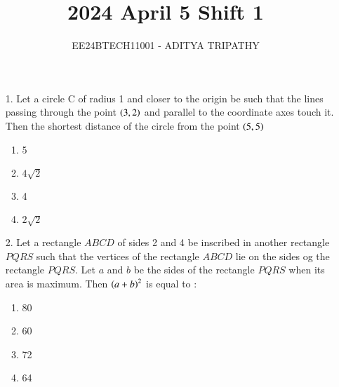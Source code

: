 \documentclass[journal,12pt,onecolumn]{IEEEtran}
\theoremstyle{remark}
\begin{document}

\vspace{3cm}

\title{2024 April 5 Shift 1}
\author{EE24BTECH11001 -  ADITYA TRIPATHY}
\maketitle

\renewcommand{\thefigure}{\theenumi}
\renewcommand{\thetable}{\theenumi}

\begin{enumerate}
	\item[1.] 
	    Let a circle C of radius 1 and closer to the origin be such that the lines
        passing through the point $\left(3, 2\right)$ and parallel to the coordinate axes touch it.
        Then the shortest distance of the circle from the point $\left(5, 5\right)$
		\hfill{}
	\begin{multicols}{4}
		\begin{enumerate}
			\item 5
			\columnbreak
        \item $4\sqrt{2}$
			\columnbreak
			\item 4
			\columnbreak
        \item $2\sqrt{2}$
		\end{enumerate}
	\end{multicols}

	\item[2.] 
        Let a rectangle $ABCD$ of sides 2 and 4 be inscribed in another rectangle $PQRS$
        such that the vertices of the rectangle $ABCD$ lie on the sides og the rectangle $PQRS$.
        Let $a$ and $b$ be the sides of the rectangle $PQRS$ when its area is maximum. Then
        $\left(a + b\right)^2$ is equal to :
		\begin{multicols}{4}
		\begin{enumerate}
			\item 80 \columnbreak
			\item 60 \columnbreak
			\item 72 \columnbreak
			\item 64
		\end{enumerate}
	\end{multicols}



\end{enumerate}
\end{document}
